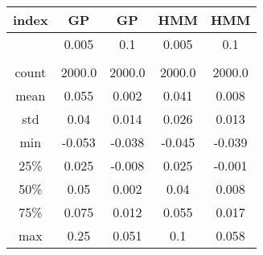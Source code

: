 \centering \begin{tabular}{c|c|c|c|c}
index	&GP	&GP	&HMM	&HMM\\\hline
	&0.005	&0.1	&0.005	&0.1\\
	&	&	&	&\\
count	&2000.0	&2000.0	&2000.0	&2000.0\\
mean	&0.055	&0.002	&0.041	&0.008\\
std	&0.04	&0.014	&0.026	&0.013\\
min	&-0.053	&-0.038	&-0.045	&-0.039\\
25\%	&0.025	&-0.008	&0.025	&-0.001\\
50\%	&0.05	&0.002	&0.04	&0.008\\
75\%	&0.075	&0.012	&0.055	&0.017\\
max	&0.25	&0.051	&0.1	&0.058\\
\end{tabular}
